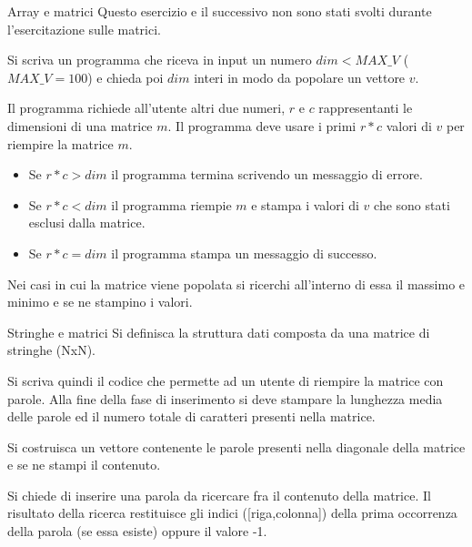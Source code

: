 \documentclass[format=169, handout]{beamer}
\begin{document}
\begin{frame}[allowframebreaks]{Array e matrici}
Questo esercizio e il successivo non sono stati svolti durante l'esercitazione sulle matrici.

Si scriva un programma che riceva in input un numero $dim<MAX\_V$ ($MAX\_V=100$) e chieda poi $dim$ interi in modo da popolare un vettore $v$. 

Il programma richiede all’utente altri due numeri, $r$ e $c$ rappresentanti le dimensioni di una matrice $m$.
Il programma deve usare i primi $r*c$ valori di $v$ per riempire la matrice $m$.

\begin{itemize}
	\item Se $r*c > dim$ il programma termina scrivendo un messaggio di errore.
	\item Se $r*c < dim$ il programma riempie $m$ e stampa i valori di $v$ che sono stati esclusi
	dalla matrice.
	\item Se $r*c = dim$ il programma stampa un messaggio di successo.
\end{itemize}

Nei casi in cui la matrice viene popolata si ricerchi all’interno di essa il massimo e minimo e se ne
stampino i valori.
\end{frame}

\begin{frame}{Stringhe e matrici}
Si definisca la struttura dati composta da una matrice di stringhe (NxN).

Si scriva quindi il codice che permette ad un utente di riempire la matrice con parole.
Alla fine della fase di inserimento si deve stampare la lunghezza media delle parole ed il numero
totale di caratteri presenti nella matrice.

Si costruisca un vettore contenente le parole presenti nella diagonale della matrice e se ne stampi
il contenuto.

Si chiede di inserire una parola da ricercare fra il contenuto della matrice. Il risultato della ricerca restituisce gli indici ([riga,colonna]) della prima occorrenza della parola (se essa esiste) oppure il valore -1.
\end{frame}
\end{document}
